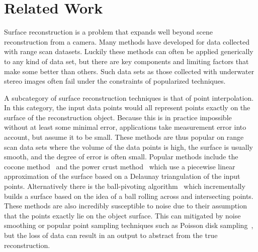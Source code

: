 \section{Related Work}\label{sec:reconrelwork}
Surface reconstruction is a problem that expands well beyond scene reconstruction from a camera. Many methods have developed for data collected with range scan datasets. Luckily these methods can often be applied generically to any kind of data set, but there are key components and limiting factors that make some better than others. Such data sets as those collected with underwater stereo images often fail under the constraints of popularized techniques. 

A subcategory of surface reconstruction techniques is that of point interpolation. In this category, the input data points would all represent points exactly on the surface of the reconstruction object. Because this is  in practice impossible without at least some minimal error, applications take measurement error into account, but assume it to be small. These methods are thus popular on range scan data sets where the volume of the data points is high, the surface is usually smooth, and the degree of error is often small. Popular methods include the cocone method~\cite{amenta2000simple} and the power crust method~\cite{amenta2001power} which use a piecewise linear approximation of the surface based on a Delaunay triangulation of the input points. Alternatively there is the ball-pivoting algorithm~\cite{817351}  which incrementally builds a surface based on the idea of a ball rolling across and intersecting points. These methods are also incredibly susceptible to noise due to their assumption that the points exactly lie on the object surface. This can mitigated by noise smoothing or popular point sampling techniques such as Poisson disk sampling~\cite{corsini2012efficient}, but the loss of data can result in an output to abstract from the true reconstruction. 

